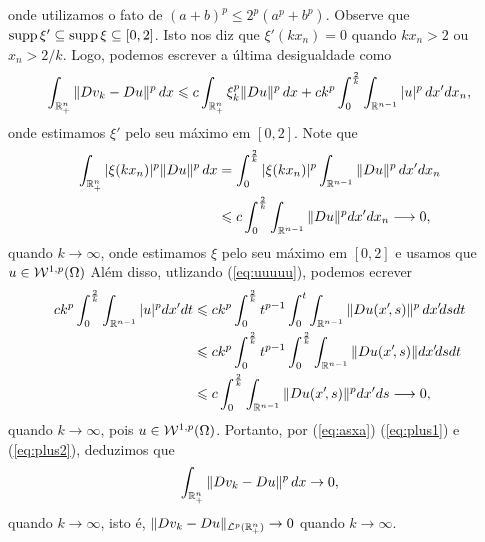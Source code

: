 \begin{prf}
    onde utilizamos o fato de $(a + b)^p \leqslant 2^p (a^p + b^p)$.
    Observe que $\mathrm{supp}\, \xi' \subseteq \mathrm{supp}\, \xi \subseteq [0,2]$. Isto nos diz que $\xi'(kx_n) = 0$ quando $kx_n > 2$ ou $x_n > 2/k$.
    Logo, podemos escrever a última desigualdade como
    \begin{equation}
        \int_{\mathbb{R}^n_+} \Vert Dv_k - Du \Vert^p \,dx \leqslant c \int_{\mathbb{R}^{n}_+} \xi_k^p \Vert Du \Vert^p \,dx + ck^p \int_{0}^{\frac{2}{k}} \int_{\mathbb{R}^{n-1}} |u|^p \,dx'dx_n,
    \end{equation}
    onde estimamos $\xi'$ pelo seu máximo em $[0,2]$.
    Note que
    \begin{equation} \label{eq:plus1}
        \begin{aligned}
            \int_{\mathbb{R}^{n}_+} |\xi(kx_n)|^p \Vert Du \Vert^p \,dx &= \int_{0}^{\frac{2}{k}} |\xi(kx_n)|^p \int_{\mathbb{R}^{n-1}} \Vert Du \Vert^p \,dx' dx_n\\
            &\leqslant c \int_{0}^{\frac{2}{k}} \int_{\mathbb{R}^{n-1}} \Vert Du \Vert^p dx' dx_n \longrightarrow 0,
        \end{aligned}
    \end{equation}
    quando $k \to \infty$, onde estimamos $\xi$ pelo seu máximo em $[0,2]$ e usamos que $u \in \mathcal{W}^{1,p}(\Omega)$ 
    Além disso, utlizando (\ref{eq:uuuuu}), podemos ecrever
    \begin{equation} \label{eq:plus2}
        \begin{aligned}
            ck^p \int_{0}^{\frac{2}{k}} \int_{\mathbb{R}^{n-1}} |u|^p dx'dt &\leqslant ck^p \int_{0}^{\frac{2}{k}} t^{p-1} \int_{0}^{t} \int_{\mathbb{R}^{n-1}} \Vert Du(x'\!,s) \Vert^p \,dx'\!ds dt\\ 
            &\leqslant ck^p\int_0^{\frac{2}{k}} t^{p-1} \int_0^{\frac{2}{k}}  \int_{\mathbb{R}^{n-1}} \Vert Du(x'\!,s) \Vert dx'\!dsdt\\
            &\leqslant c \int_0^{\frac{2}{k}} \int_{\mathbb{R}^{n-1}} \Vert Du(x'\!,s) \Vert^p dx'ds \longrightarrow 0,
        \end{aligned}
    \end{equation}
    quando $k \to \infty$, pois $u \in \mathcal{W}^{1,p}(\Omega)$.
    Portanto, por (\ref{eq:asxa}) (\ref{eq:plus1}) e (\ref{eq:plus2}), deduzimos que
    \[
        \int_{\mathbb{R}^n_+} \Vert Dv_k - Du \Vert^p \,dx \to 0,
    \]
    quando $k \to \infty$,
    isto é, $\Vert Dv_k - Du \Vert_{\mathcal{L}^p(\mathbb{R}^n_+)} \to 0$ quando $k \to \infty$.


\end{prf}
